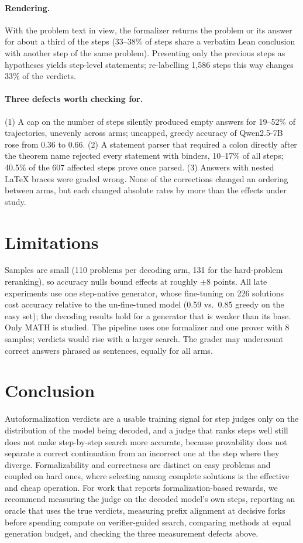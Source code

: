 \documentclass[10pt]{article}
\begin{document}
\paragraph{Rendering.} With the problem text in view, the formalizer returns the problem or its answer for about a third of the steps (33--38\% of steps share a verbatim Lean conclusion with another step of the same problem). Presenting only the previous steps as hypotheses yields step-level statements; re-labelling 1{,}586 steps this way changes 33\% of the verdicts.

\paragraph{Three defects worth checking for.} (1) A cap on the number of steps silently produced empty answers for 19--52\% of trajectories, unevenly across arms; uncapped, greedy accuracy of Qwen2.5-7B rose from 0.36 to 0.66. (2) A statement parser that required a colon directly after the theorem name rejected every statement with binders, 10--17\% of all steps; 40.5\% of the 607 affected steps prove once parsed. (3) Answers with nested \LaTeX{} braces were graded wrong. None of the corrections changed an ordering between arms, but each changed absolute rates by more than the effects under study.

\section{Limitations}

Samples are small (110 problems per decoding arm, 131 for the hard-problem reranking), so accuracy nulls bound effects at roughly $\pm 8$ points. All late experiments use one step-native generator, whose fine-tuning on 226 solutions cost accuracy relative to the un-fine-tuned model (0.59 vs.\ 0.85 greedy on the easy set); the decoding results hold for a generator that is weaker than its base. Only MATH is studied. The pipeline uses one formalizer and one prover with 8 samples; verdicts would rise with a larger search. The grader may undercount correct answers phrased as sentences, equally for all arms.

\section{Conclusion}

Autoformalization verdicts are a usable training signal for step judges only on the distribution of the model being decoded, and a judge that ranks steps well still does not make step-by-step search more accurate, because provability does not separate a correct continuation from an incorrect one at the step where they diverge. Formalizability and correctness are distinct on easy problems and coupled on hard ones, where selecting among complete solutions is the effective and cheap operation. For work that reports formalization-based rewards, we recommend measuring the judge on the decoded model's own steps, reporting an oracle that uses the true verdicts, measuring prefix alignment at decisive forks before spending compute on verifier-guided search, comparing methods at equal generation budget, and checking the three measurement defects above.
\end{document}
